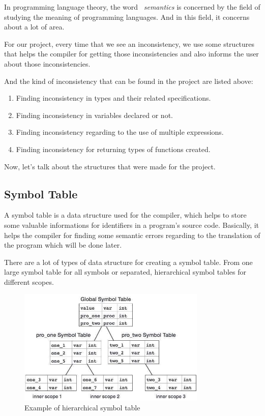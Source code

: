 \documentclass[
  oneside,
  11pt, a4paper,
  footinclude=true,
  headinclude=true,
  cleardoublepage=empty
]{scrbook}
\begin{document}
In programming language theory, the word ~\textit{semantics} is concerned by the field of studying the meaning of programming languages.
And in this field, it concerns about a lot of area.

For our project, every time that we see an inconsistency, we use some structures that helps the compiler for getting those inconsistencies and also informs the user about those inconsistencies.

And the kind of inconsistency that can be found in the project are listed above:

\begin{enumerate}
\item Finding inconsistency in types and their related specifications.
\item Finding inconsistency in variables declared or not.
\item Finding inconsistency regarding to the use of multiple expressions.
\item Finding inconsistency for returning types of functions created.
\end{enumerate}

Now, let's talk about the structures that were made for the project.


\subsection{Symbol Table}

A symbol table is a data structure used for the compiler, which helps to store some valuable informations for identifiers in a program's source code. Basically, it helps the compiler for finding some semantic errors regarding to the translation of the program which will be done later.

There are a lot of types of data structure for creating a symbol table. From one large symbol table for all symbols or separated, hierarchical symbol tables for different scopes.

\begin{figure}[h!]
  \centering
    \includegraphics[width=0.8\textwidth]{img/symbol_table_hierarchical.jpg}
    \caption{Example of hierarchical symbol table}
    \label{fig:hierarchical_symbol_table}
\end{figure}
\end{document}
